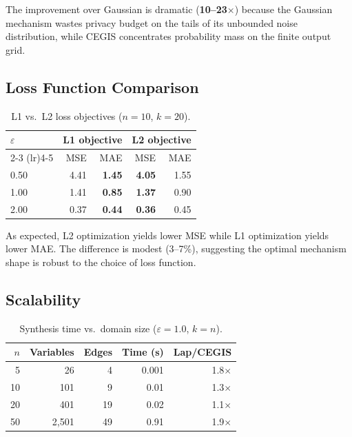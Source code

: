 \documentclass[11pt,a4paper]{article}
\begin{document}
The improvement over Gaussian is dramatic (\textbf{10--23$\times$}) because
the Gaussian mechanism wastes privacy budget on the tails of its unbounded
noise distribution, while CEGIS concentrates probability mass on the
finite output grid.


\subsection{Loss Function Comparison}

\begin{table}[h]
\centering
\caption{L1 vs.\ L2 loss objectives ($n = 10$, $k = 20$).}
\label{tab:loss}
\begin{tabular}{@{}lrrrr@{}}
\toprule
$\varepsilon$ & \multicolumn{2}{c}{L1 objective} & \multicolumn{2}{c}{L2 objective} \\
\cmidrule(lr){2-3} \cmidrule(lr){4-5}
 & MSE & MAE & MSE & MAE \\
\midrule
0.50 & 4.41 & \textbf{1.45} & \textbf{4.05} & 1.55 \\
1.00 & 1.41 & \textbf{0.85} & \textbf{1.37} & 0.90 \\
2.00 & 0.37 & \textbf{0.44} & \textbf{0.36} & 0.45 \\
\bottomrule
\end{tabular}
\end{table}

As expected, L2 optimization yields lower MSE while L1 optimization yields
lower MAE.  The difference is modest (3--7\%), suggesting the optimal
mechanism shape is robust to the choice of loss function.


\subsection{Scalability}

\begin{table}[h]
\centering
\caption{Synthesis time vs.\ domain size ($\varepsilon = 1.0$, $k = n$).}
\label{tab:scalability}
\begin{tabular}{@{}rrrrr@{}}
\toprule
$n$ & Variables & Edges & Time (s) & Lap/CEGIS \\
\midrule
  5 &    26 &   4 & 0.001 & 1.8$\times$ \\
 10 &   101 &   9 & 0.01  & 1.3$\times$ \\
 20 &   401 &  19 & 0.02  & 1.1$\times$ \\
 50 & 2{,}501 &  49 & 0.91  & 1.9$\times$ \\
\bottomrule
\end{tabular}
\end{table}
\end{document}
